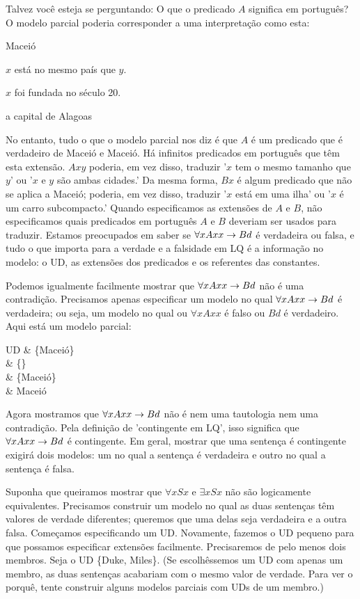 Talvez você esteja se perguntando: O que o predicado $A$ significa em português? O modelo parcial poderia corresponder a uma interpretação como esta:
\begin{ekey}
\item[UD:] Maceió
\item[$Axy$:] $x$ está no mesmo país que $y$.
\item[$Bx$:] $x$ foi fundada no século 20.
\item[$d$:] a capital de Alagoas
\end{ekey}
No entanto, tudo o que o modelo parcial nos diz é que $A$ é um predicado que é verdadeiro de Maceió e Maceió. Há infinitos predicados em português que têm esta extensão. $Axy$ poderia, em vez disso, traduzir '$x$ tem o mesmo tamanho que $y$' ou '$x$ e $y$ são ambas cidades.' Da mesma forma, $Bx$ é algum predicado que não se aplica a Maceió; poderia, em vez disso, traduzir '$x$ está em uma ilha' ou '$x$ é um carro subcompacto.' Quando especificamos as extensões de $A$ e $B$, não especificamos quais predicados em português $A$ e $B$ deveriam ser usados para traduzir. Estamos preocupados em saber se $\forall xAxx \rightarrow Bd$ é verdadeira ou falsa, e tudo o que importa para a verdade e a falsidade em LQ é a informação no modelo: o UD, as extensões dos predicados e os referentes das constantes.

Podemos igualmente facilmente mostrar que $\forall xAxx \rightarrow Bd$ não é uma contradição. Precisamos apenas especificar um modelo no qual $\forall xAxx \rightarrow Bd$ é verdadeira; ou seja, um modelo no qual ou $\forall x Axx$ é falso ou $Bd$ é verdadeiro. Aqui está um modelo parcial:
\begin{partialmodel}
	UD			& \{Maceió\}\\
	 	& \{\}\\
		& \{Maceió\}\\
		& Maceió
\end{partialmodel}

Agora mostramos que $\forall xAxx \rightarrow Bd$ não é nem uma tautologia nem uma contradição. Pela definição de 'contingente em LQ', isso significa que 
$\forall xAxx \rightarrow Bd$ é contingente. Em geral, mostrar que uma sentença é contingente exigirá dois modelos: um no qual a sentença é verdadeira e outro no qual a sentença é falsa.

Suponha que queiramos mostrar que $\forall x Sx$ e $\exists x Sx$ não são logicamente equivalentes. Precisamos construir um modelo no qual as duas sentenças têm valores de verdade diferentes; queremos que uma delas seja verdadeira e a outra falsa. Começamos especificando um UD. Novamente, fazemos o UD pequeno para que possamos especificar extensões facilmente. Precisaremos de pelo menos dois membros. Seja o UD \{Duke, Miles\}. (Se escolhêssemos um UD com apenas um membro, as duas sentenças acabariam com o mesmo valor de verdade. Para ver o porquê, tente construir alguns modelos parciais com UDs de um membro.)

